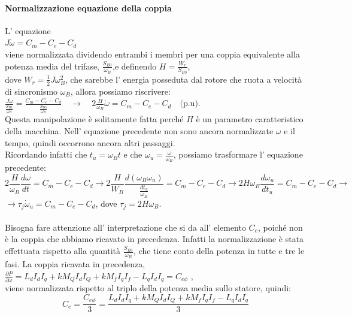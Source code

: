 \documentclass[Lau,noexaminfo]{sapthesis}
\begin{document}
	 \paragraph{Normalizzazione equazione della coppia}
	 L' equazione\\
	 $J\dot{\omega}=C_m-C_e-C_d$ \\viene normalizzata dividendo entrambi i membri per una coppia equivalente alla potenza media del trifase, $\frac{S_{B3}}{\omega_B}$,e definendo
	 $H=\frac{W_r}{S_{B3}}$,\\dove $W_r=\frac{1}{2}J\omega_B^2$, che sarebbe l' energia posseduta dal rotore che ruota a velocità di sincronismo $\omega_B$, allora possiamo riscrivere:\\
	 $\frac{J\dot{\omega}}{\frac{S_{B3}}{\omega_B}}=\frac{C_m-C_e -C_d}{\frac{S_{B3}}{\omega_B}}\quad\rightarrow\quad2\frac{H}{\omega_B}\dot{\omega}=C_m -C_e -C_d\quad \text{(p.u)}$. \\Questa manipolazione è solitamente fatta perché $H$ è un parametro caratteristico della macchina. Nell' equazione precedente non sono ancora normalizzate $\omega$ e il tempo, quindi occorrono ancora altri passaggi.\\Ricordando infatti che $t_u=\omega_Bt$ e che $\omega_u=\frac{\omega}{\omega_B}$, possiamo trasformare l' equazione precedente:\\
	 \begin{equation*}
	 2\frac{H}{\omega_B} \frac{d\omega}{dt}=C_m-C_e-C_d \rightarrow 2\frac{H}{W_B}\frac{d(\omega_B \omega_u)}{\frac{dt_u}{\omega_B}}=C_m-C_e-C_d \rightarrow 2H\omega_B \frac{d\omega_u}{dt_u}=C_m-C_e-C_d \rightarrow 
	 \end{equation*}
	 $\rightarrow \tau_j \dot{\omega}_u=C_m-C_e-C_d$, dove $\tau_j=2H\omega_B$.\\\\
	 Bisogna fare attenzione all' interpretazione che si da all' elemento $C_e$, poiché non è la coppia che abbiamo ricavato in precedenza. Infatti la normalizzazione è stata effettuata rispetto alla quantità $\frac{S_{B3}}{\omega_B}$, che tiene conto della potenza in tutte e tre le fasi. La coppia ricavata in precedenza,\\
	 $\frac{\partial P}{\partial \omega} = L_dI_dI_q+kM_QI_dI_Q+kM_fI_qI_f-L_qI_dI_q=C_{e\phi} $ ,\\
	 viene normalizzata rispetto al triplo della potenza media sullo statore, quindi:\\
	 \begin{equation*}
	 C_e=\frac{C_{e\phi}}{3}=\frac{L_dI_dI_q+kM_QI_dI_Q+kM_fI_qI_f-L_qI_dI_q}{3}
	 \end{equation*}
\end{document}
